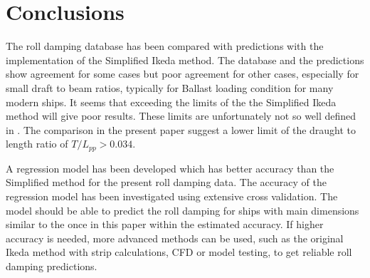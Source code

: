 \section{Conclusions}
\label{se:conclusions}
The roll damping database has been compared with predictions with the implementation of the Simplified Ikeda method. The database and the predictions show agreement for some cases but poor agreement for other cases, especially for small draft to beam ratios, typically for Ballast loading condition for many modern ships. It seems that exceeding the limits of the the Simplified Ikeda method will give poor results. These limits are unfortunately not so well defined in \parencite{kawahara_simple_2011}. The comparison in the present paper suggest a lower limit of the draught to length ratio of $T/L_{pp}>0.034$.

A regression model has been developed which has better accuracy than the Simplified method for the present roll damping data. The accuracy of the regression model has been investigated using extensive cross validation. The model should be able to predict the roll damping for ships with main dimensions similar to the once in this paper within the estimated accuracy.
If higher accuracy is needed, more advanced methods can be used, such as the original Ikeda method with strip calculations, CFD or model testing, to get reliable roll damping predictions.

